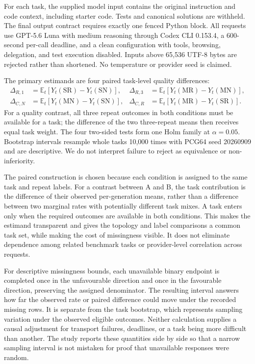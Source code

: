For each task, the supplied model input contains the original instruction and code context, including starter code. Tests and canonical solutions are withheld. The final output contract requires exactly one fenced Python block. All requests use GPT-5.6 Luna with medium reasoning through Codex CLI 0.153.4, a 600-second per-call deadline, and a clean configuration with tools, browsing, delegation, and test execution disabled. Inputs above 65,536 UTF-8 bytes are rejected rather than shortened. No temperature or provider seed is claimed.

The primary estimands are four paired task-level quality differences:
\begin{align}
\Delta_{R,1}&=\mathbb{E}_t[Y_t(\mathrm{SR})-Y_t(\mathrm{SN})], &
\Delta_{R,3}&=\mathbb{E}_t[Y_t(\mathrm{MR})-Y_t(\mathrm{MN})],\\
\Delta_{C,N}&=\mathbb{E}_t[Y_t(\mathrm{MN})-Y_t(\mathrm{SN})], &
\Delta_{C,R}&=\mathbb{E}_t[Y_t(\mathrm{MR})-Y_t(\mathrm{SR})].
\end{align}
For a quality contrast, all three repeat outcomes in both conditions must be available for a task; the difference of the two three-repeat means then receives equal task weight. The four two-sided tests form one Holm family at $\alpha=0.05$. Bootstrap intervals resample whole tasks 10,000 times with PCG64 seed 20260909 and are descriptive. We do not interpret failure to reject as equivalence or non-inferiority.

The paired construction is chosen because each condition is assigned to the same task and repeat labels. For a contrast between A and B, the task contribution is the difference of their observed per-generation means, rather than a difference between two marginal rates with potentially different task mixes. A task enters only when the required outcomes are available in both conditions. This makes the estimand transparent and gives the topology and label comparisons a common task set, while making the cost of missingness visible. It does not eliminate dependence among related benchmark tasks or provider-level correlation across requests.

For descriptive missingness bounds, each unavailable binary endpoint is completed once in the unfavourable direction and once in the favourable direction, preserving the assigned denominator. The resulting interval answers how far the observed rate or paired difference could move under the recorded missing rows. It is separate from the task bootstrap, which represents sampling variation under the observed eligible outcomes. Neither calculation supplies a causal adjustment for transport failures, deadlines, or a task being more difficult than another. The study reports these quantities side by side so that a narrow sampling interval is not mistaken for proof that unavailable responses were random.

